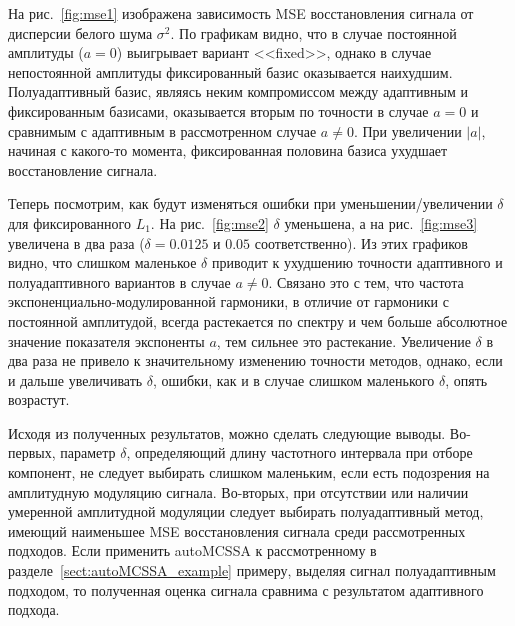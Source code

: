 \documentclass[specialist,
substylefile = spbu_report.rtx,
subf,href,colorlinks=true, 12pt]{disser}
\theoremstyle{definition}
\begin{document}
На рис.~\ref{fig:mse1} изображена зависимость MSE восстановления сигнала от дисперсии белого шума $\sigma^2$. По графикам видно, что в случае постоянной амплитуды ($a=0$) выигрывает вариант <<fixed>>, однако в случае непостоянной амплитуды фиксированный базис оказывается наихудшим. Полуадаптивный базис, являясь неким компромиссом между адаптивным и фиксированным базисами, оказывается вторым по точности в случае $a=0$ и сравнимым с адаптивным в рассмотренном случае $a\ne0$. При увеличении $|a|$, начиная с какого-то момента, фиксированная половина базиса ухудшает восстановление сигнала.

Теперь посмотрим, как будут изменяться ошибки при уменьшении/увеличении $\delta$ для фиксированного $L_1$. На рис.~\ref{fig:mse2} $\delta$ уменьшена, а на рис.~\ref{fig:mse3} увеличена в два раза ($\delta=0.0125$ и $0.05$ соответственно). Из этих графиков видно, что слишком маленькое $\delta$ приводит к ухудшению точности адаптивного и полуадаптивного вариантов в случае $a\ne0$. Связано это с тем, что частота экспоненциально-модулированной гармоники, в отличие от гармоники с постоянной амплитудой, всегда растекается по спектру и чем больше абсолютное значение показателя экспоненты $a$, тем сильнее это растекание. Увеличение $\delta$ в два раза не привело к значительному изменению точности методов, однако, если и дальше увеличивать $\delta$, ошибки, как и в случае слишком маленького $\delta$, опять возрастут.

Исходя из полученных результатов, можно сделать следующие выводы. Во-первых, параметр $\delta$, определяющий длину частотного интервала при отборе компонент, не следует выбирать слишком маленьким, если есть подозрения на амплитудную модуляцию сигнала. Во-вторых, при отсутствии или наличии умеренной амплитудной модуляции следует выбирать полуадаптивный метод, имеющий наименьшее MSE восстановления сигнала среди рассмотренных подходов. Если применить autoMCSSA к рассмотренному в разделе~\ref{sect:autoMCSSA_example} примеру, выделяя сигнал полуадаптивным подходом, то полученная оценка сигнала сравнима с результатом адаптивного подхода.
\end{document}
